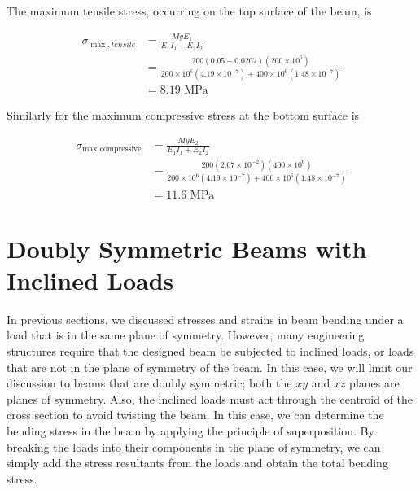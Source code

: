\documentclass[
fontsize=10pt,
a4paper,
twosides=false,
open=any,
svgnames,
]{kaobook} %
\begin{document}
\begin{example}
The maximum tensile stress, occurring on the top surface of the beam, is

\begin{align*}
  \sigma_{\max,tensile} &= \frac{MyE_1}{E_1I_1 + E_2I_2} \\
                             &= \frac{200(0.05 - 0.0207)(200 \times 10^6)}{200 \times 10^6(4.19 \times 10^{-7}) + 400 \times 10^6(1.48 \times 10^{ -7})} \\
                             &= 8.19 \text{ MPa}
\end{align*}

Similarly for the maximum compressive stress at the bottom surface is

\begin{align*}
  \sigma_{\max \text{ compressive}} &= \frac{MyE_2}{E_1I_1 + E_2I_2} \\
                                 &= \frac{200(2.07 \times 10^{ - 2})(400 \times 10^6)}{200 \times 10^6(4.19 \times 10^{-7}) + 400 \times 10^6(1.48 \times 10^{-7})} \\
                                 &= 11.6 \text{ MPa}
\end{align*}

\end{example}

\section{Doubly Symmetric Beams with Inclined Loads}

In previous sections, we discussed stresses and strains in beam bending under a load that is in the same plane of symmetry. However, many engineering structures require that the designed beam be subjected to inclined loads, or loads that are not in the plane of symmetry of the beam. In this case, we will limit our discussion to beams that are doubly symmetric; both the $xy$ and $xz$ planes are planes of symmetry. Also, the inclined loads must act through the centroid of the cross section to avoid twisting the beam.
In this case, we can determine the bending stress in the beam by applying the principle of superposition. By breaking the loads into their components in the plane of symmetry, we can simply add the stress resultants from the loads and obtain the total bending stress.
\end{document}
